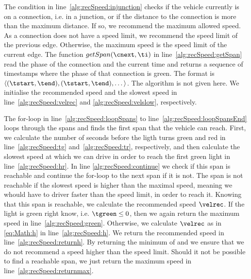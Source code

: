 The condition in line~\ref{alg:recSpeed:injunction} checks if the vehicle currently is on a connection, i.e. in a junction, or if the distance to the connection is more than the maximum distance. 
If so, we recommend the maximum allowed speed. 
As a connection does not have a speed limit, we recommend the speed limit of the previous edge.
Otherwise, the maximum speed is the speed limit of the current edge.
The function $getSpan(\cnext, \ti)$ in line~\ref{alg:recSpeed:getSpan} read the phase of the connection and the current time and returns a sequence of timestamps where the phase of that connection is green. The format is $\langle(\tstart, \tend), (\tstart, \tend), \dots\rangle$.
The algorithm is not given here.
We initialise the recommended speed and the slowest speed in line~\ref{alg:recSpeed:velrec} and \ref{alg:recSpeed:velslow}, respectively.

The for-loop in line~\ref{alg:recSpeed:loopSpans} to line~\ref{alg:recSpeed:loopSpansEnd} loops through the spans and finds the first span that the vehicle can reach.
First, we calculate the number of seconds before the ligth turns green and red in line~\ref{alg:recSpeed:tg} and~\ref{alg:recSpeed:tr}, respectively, and then calculate the slowest speed at which we can drive in order to reach the first green light in line~\ref{alg:recSpeed:hr}.
In line \ref{alg:recSpeed:continue} we check if this span is reachable and continue the for-loop to the next span if it is not. 
The span is not reachable if the slowest speed is higher than the maximal speed, meaning we whould have to driver faster than the speed limit, in order to reach it.
Knowing that this span is reachable, we calculate the recommended speed $\velrec$.
If the light is green right know, i.e. $\tgreen \leq 0$, then we again return the maximum speed in line~\ref{alg:recSpeed:green}. 
Otherwise, we calculate $\velrec$ as in \eqref{eq:Math:h} in line~\ref{alg:recSpeed:h}.
We return the recommended speed in line~\ref{alg:recSpeed:returnh}.
By returning the minimum of \velrec and \velmax we ensure that we do not recommend a speed higher than the speed limit.
Should it not be possible to find a reachable span, we just return the maximum speed in line~\ref{alg:recSpeed:returnmax}.

